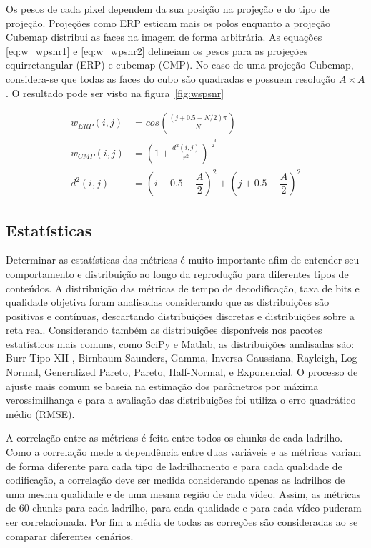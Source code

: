 Os pesos de cada pixel dependem da sua posição na projeção e do tipo de projeção. Projeções como ERP esticam mais os polos enquanto a projeção Cubemap distribui as faces na imagem de forma arbitrária. As equações \ref{eq:w_wpsnr1} e \ref{eq:w_wpsnr2} delineiam os pesos para as projeções equirretangular (ERP) e cubemap (CMP). No caso de uma projeção Cubemap, considera-se que todas as faces do cubo são quadradas e possuem resolução $A \times A$. O resultado pode ser visto na figura~\ref{fig:wspsnr}

\begin{align}
        \label{eq:w_wpsnr1}
        w_{ERP}(i,j)&=cos\left(\frac{(j+0.5-N/2)\pi}{N}\right) \\
        \label{eq:w_wpsnr2}
        w_{CMP}(i,j)&=\left(1 + \frac{d^2(i,j)}{r^2}\right)^{\frac{-3}{2}} \\
        d^2(i, j)&=(i+0.5-\dfrac{A}{2})^2 +(j+0.5-\dfrac{A}{2})^2
\end{align}

\subsection{Estatísticas}

Determinar as estatísticas das métricas é muito importante afim de entender seu comportamento e distribuição ao longo da reprodução para diferentes tipos de conteúdos. A distribuição das métricas de tempo de decodificação, taxa de bits e qualidade objetiva foram analisadas considerando que as distribuições são positivas e contínuas, descartando distribuições discretas e distribuições sobre a reta real. Considerando também as distribuições disponíveis nos pacotes estatísticos mais comuns, como SciPy e Matlab, as distribuições analisadas são: Burr Tipo XII , Birnbaum-Saunders, Gamma, Inversa Gaussiana, Rayleigh, Log Normal, Generalized Pareto, Pareto, Half-Normal, e Exponencial. O processo de ajuste mais comum se baseia na estimação dos parâmetros por máxima verossimilhança e para a avaliação das distribuições foi utiliza o erro quadrático médio (RMSE).

A correlação entre as métricas é feita entre todos os chunks de cada ladrilho. Como a correlação mede a dependência entre duas variáveis e as métricas variam de forma diferente para cada tipo de ladrilhamento e para cada qualidade de codificação, a correlação deve ser medida considerando apenas as ladrilhos de uma mesma qualidade e de uma mesma região de cada vídeo. Assim, as métricas de 60 chunks para cada ladrilho, para cada qualidade e para cada vídeo puderam ser correlacionada. Por fim a média de todas as correções são consideradas ao se comparar diferentes cenários.


